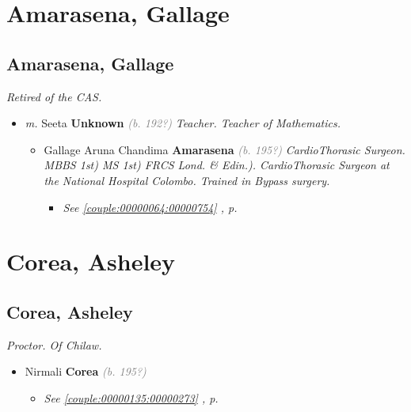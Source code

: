 \documentclass[10pt, openany]{book}
\begin{document}
\part{Amarasena, Gallage}
\chapter{Amarasena, Gallage}
\label{00000063}
\textcolor{slmaroon}{\textit{Retired of the CAS.}}
\begin{itemize}
\item{\textit{m.} Seeta \textbf{Unknown} \textcolor{gray}{\textit{(b. 192?)}} \textcolor{slmaroon}{\textit{Teacher.
Teacher of Mathematics.}}   \label{couple:00000063:00000908} \begin{itemize}
\item{Gallage Aruna Chandima \textbf{Amarasena} \textcolor{gray}{\textit{(b. 195?)}} \textcolor{slmaroon}{\textit{CardioThorasic Surgeon.
MBBS 1st) MS 1st) FRCS Lond. \& Edin.).
CardioThorasic Surgeon at the National Hospital Colombo. Trained in Bypass surgery.}}
\begin{itemize}
\item{\textcolor{slteal}{\textit{See  \autoref{couple:00000064:00000754} \textit{, p. \pageref{couple:00000064:00000754} }}}}
\end{itemize}
   }
\end{itemize}}
\end{itemize}
 
\part{Corea, Asheley}
\chapter{Corea, Asheley}
\label{00000134}
\textcolor{slmaroon}{\textit{Proctor.
Of Chilaw.}}
\begin{itemize}
\item{Nirmali \textbf{Corea} \textcolor{gray}{\textit{(b. 195?)}}
\begin{itemize}
\item{\textcolor{slteal}{\textit{See  \autoref{couple:00000135:00000273} \textit{, p. \pageref{couple:00000135:00000273} }}}}
\end{itemize}
 }
\end{itemize}
 
\end{document}
